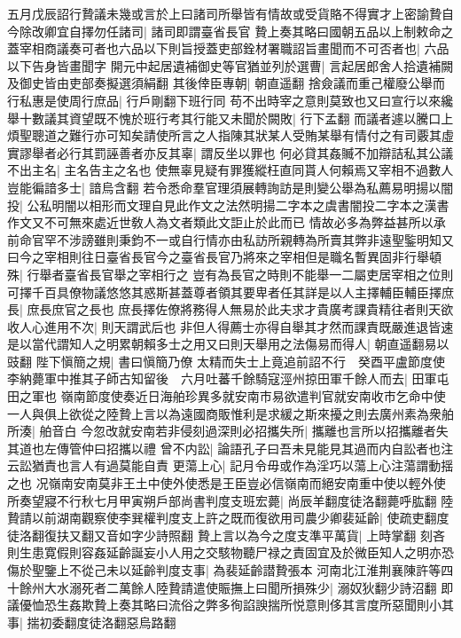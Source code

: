 五月戊辰詔行贄議未幾或言於上曰諸司所舉皆有情故或受貨賂不得實才上密諭贄自今除改卿宜自擇勿任諸司|{
	諸司即謂臺省長官}
贄上奏其略曰國朝五品以上制敕命之蓋宰相商議奏可者也六品以下則旨授蓋吏部銓材署職詔旨畫聞而不可否者也|{
	六品以下告身皆畫聞字}
開元中起居遺補御史等官猶並列於選曹|{
	言起居郎舍人拾遺補闕及御史皆由吏部奏擬選須絹翻}
其後倖臣專朝|{
	朝直遥翻}
捨僉議而重己權廢公舉而行私惠是使周行庶品|{
	行戶剛翻下班行同}
苟不出時宰之意則莫致也又曰宣行以來纔舉十數議其資望既不愧於班行考其行能又未聞於闕敗|{
	行下孟翻}
而議者遽以騰口上煩聖聰道之難行亦可知矣請使所言之人指陳其狀某人受賄某舉有情付之有司覈其虛實謬舉者必行其罰誣善者亦反其辜|{
	謂反坐以罪也}
何必貸其姦贓不加辯詰私其公議不出主名|{
	主名告主之名也}
使無辜見疑有罪獲縱枉直同貰人何賴焉又宰相不過數人豈能徧諳多士|{
	諳烏含翻}
若令悉命羣官理須展轉詢訪是則變公舉為私薦易明揚以闇投|{
	公私明闇以相形而文理自見此作文之法然明揚二字本之虞書闇投二字本之漢書作文又不可無來處近世敎人為文者類此文詎止於此而已}
情故必多為弊益甚所以承前命官罕不涉謗雖則秉鈞不一或自行情亦由私訪所親轉為所賣其弊非遠聖鍳明知又曰今之宰相則往日臺省長官今之臺省長官乃將來之宰相但是職名暫異固非行舉頓殊|{
	行舉者臺省長官舉之宰相行之}
豈有為長官之時則不能舉一二屬吏居宰相之位則可擇千百具僚物議悠悠其惑斯甚蓋尊者領其要卑者任其詳是以人主擇輔臣輔臣擇庶長|{
	庶長庶官之長也}
庶長擇佐僚將務得人無易於此夫求才貴廣考課貴精往者則天欲收人心進用不次|{
	則天謂武后也}
非但人得薦士亦得自舉其才然而課責既嚴進退皆速是以當代謂知人之明累朝賴多士之用又曰則天舉用之法傷易而得人|{
	朝直遥翻易以豉翻}
陛下愼簡之規|{
	書曰愼簡乃僚}
太精而失士上竟追前詔不行　癸酉平盧節度使李納薨軍中推其子師古知留後　六月吐蕃千餘騎寇涇州掠田軍千餘人而去|{
	田軍屯田之軍也}
嶺南節度使奏近日海舶珍異多就安南市易欲遣判官就安南收市乞命中使一人與俱上欲從之陸贄上言以為遠國商販惟利是求緩之斯來擾之則去廣州素為衆舶所湊|{
	舶音白}
今忽改就安南若非侵刻過深則必招攜失所|{
	攜離也言所以招攜離者失其道也左傳管仲曰招攜以禮}
曾不内訟|{
	論語孔子曰吾未見能見其過而内自訟者也注云訟猶責也言人有過莫能自責}
更蕩上心|{
	記月令毋或作為淫巧以蕩上心注蕩謂動揺之也}
况嶺南安南莫非王土中使外使悉是王臣豈必信嶺南而絕安南重中使以輕外使所奏望寢不行秋七月甲寅朔戶部尚書判度支班宏薨|{
	尚辰羊翻度徒洛翻薨呼肱翻}
陸贄請以前湖南觀察使李巽權判度支上許之既而復欲用司農少卿裴延齡|{
	使疏吏翻度徒洛翻復扶又翻又音如字少詩照翻}
贄上言以為今之度支準平萬貨|{
	上時掌翻}
刻吝則生患寛假則容姦延齡誕妄小人用之交駭物聽尸禄之責固宜及於微臣知人之明亦恐傷於聖鑒上不從己未以延齡判度支事|{
	為裴延齡譛贄張本}
河南北江淮荆襄陳許等四十餘州大水溺死者二萬餘人陸贄請遣使賑撫上曰聞所損殊少|{
	溺奴狄翻少詩沼翻}
即議優恤恐生姦欺贄上奏其略曰流俗之弊多徇諂諛揣所悦意則侈其言度所惡聞則小其事|{
	揣初委翻度徒洛翻惡烏路翻}
